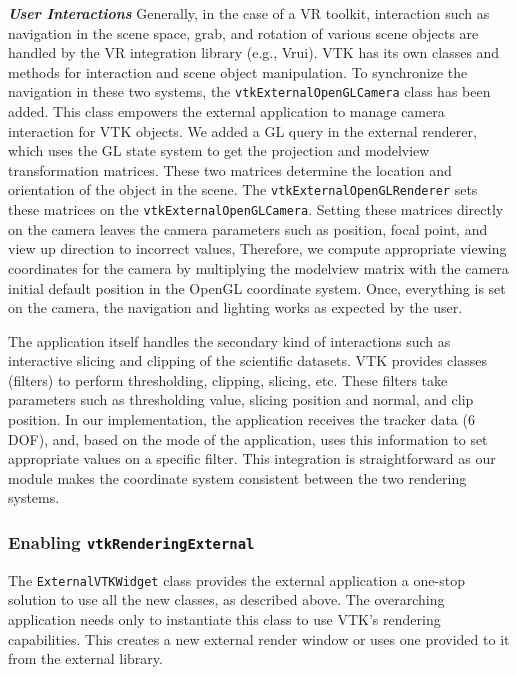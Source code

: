 \textbf{\textit{User Interactions}} Generally, in the case of a VR toolkit, interaction such as navigation in the scene space, grab, and rotation of various scene objects are handled by the VR integration library (e.g., Vrui).
VTK has its own classes and methods for interaction and scene object manipulation.
To synchronize the navigation in these two systems, the \texttt{vtkExternalOpenGLCamera} class has been added.
This class empowers the external application to manage camera interaction for VTK objects.
We added a GL query in the external renderer, which uses the GL state system to get the projection and modelview transformation matrices.
These two matrices determine the location and orientation of the object in the scene.
The \texttt{vtkExternalOpenGLRenderer} sets these matrices on the \texttt{vtkExternalOpenGLCamera}.
Setting these matrices directly on the camera leaves the camera parameters such as position, focal point, and view up direction to incorrect values, Therefore, we compute appropriate viewing coordinates for the camera by multiplying the modelview matrix with the camera initial default position in the OpenGL coordinate system. 
Once, everything is set on the camera, the navigation and lighting works as expected by the user.

The application itself handles the secondary kind of interactions such as interactive slicing and clipping of the scientific datasets.
VTK provides classes (filters) to perform thresholding, clipping, slicing, etc.
These filters take parameters such as thresholding value, slicing position and normal, and clip position. 
In our implementation, the application receives the tracker data (6 DOF), and, based on the mode of the application, uses this information to set appropriate values on a specific filter.
This integration is straightforward as our module makes the coordinate system consistent between the two rendering systems.

\subsubsection{Enabling \texttt{vtkRenderingExternal}}

The \texttt{ExternalVTKWidget} class provides the external application
a one-stop solution to use all the new classes, as described above.
The overarching application needs only to instantiate this class to use VTK's rendering capabilities.
This creates a new external render window or uses one provided to it from the external library.

